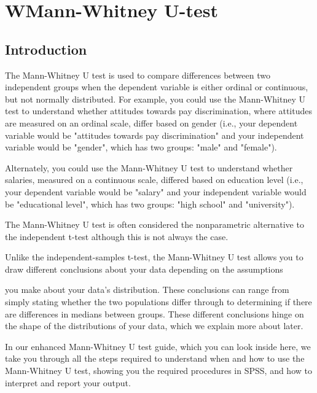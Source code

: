 \documentclass[]{article}
\title{}
\author{}
\begin{document}
\maketitle

\section{WMann-Whitney U-test}




\subsection{Introduction}
The Mann-Whitney U test is used to compare differences between two independent groups when the dependent variable is either ordinal or continuous, but not normally distributed.
For example, you could use the Mann-Whitney U test to understand whether attitudes towards pay discrimination, where attitudes are measured on an ordinal scale, 
differ based on gender (i.e., your dependent variable would be "attitudes towards pay discrimination" 
and your independent variable would be "gender", which has two groups: "male" and "female"). 

Alternately, you could use the Mann-Whitney U test to understand whether salaries, measured on a continuous scale, differed 
based on education level (i.e., your dependent variable would be "salary" and your independent variable would be "educational level", which 
has two groups: "high school" and "university"). 

The Mann-Whitney U test is often considered the nonparametric alternative to the independent t-test although this is not always the case.

Unlike the independent-samples t-test, the Mann-Whitney U test allows you to draw different conclusions about your data depending on the assumptions 

you make about your data's distribution. These conclusions can range from simply stating whether the two populations differ through to 
determining if there are differences in medians between groups. These different conclusions hinge on the shape of the distributions of your 
data, which we explain more about later.

In our enhanced Mann-Whitney U test guide, which you can look inside here, we take you through all the steps required to understand when and
 how to use the Mann-Whitney U test, showing you the required procedures in SPSS, and how to interpret and report your output. 
\end{document}
